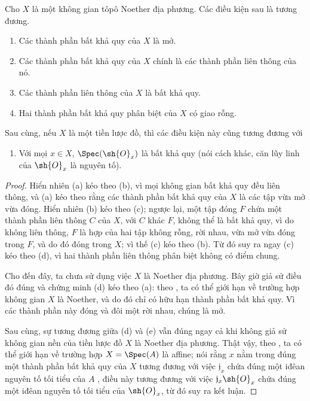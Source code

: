 \documentclass[oneside]{amsart}
\newcommand{\oldpage}[2][]{{\marginnote{\normalfont\textbf{#1}~|~#2}}\ignorespaces}
\let\EGAOriginalLabel\label
\renewcommand{\label}[1]{\phantomsection\EGAOriginalLabel{#1}}
\begin{document}
\begin{proposition}[6.1.10]
\label{I.6.1.10}
Cho $X$ là một không gian tôpô Noether địa phương.
Các điều kiện sau là tương đương.
\begin{enumerate}
  \item[{\rm(a)}] Các thành phần bất khả quy của $X$ là mở.
  \item[{\rm(b)}] Các thành phần bất khả quy của $X$ chính là các thành phần
    liên thông của nó.
  \item[{\rm(c)}] Các thành phần liên thông của $X$ là bất khả quy.
  \item[{\rm(d)}] Hai thành phần bất khả quy phân biệt của $X$ có giao rỗng.
\end{enumerate}
Sau cùng, nếu $X$ là một tiền lược đồ, thì các điều kiện này cũng tương đương
với
\begin{enumerate}
  \item[{\rm(e)}] Với mọi $x\in X$, $\Spec(\sh{O}_x)$ là bất khả quy (nói cách
    khác, căn lũy linh của $\sh{O}_x$ là nguyên tố).
\end{enumerate}
\end{proposition}

\begin{proof}
Hiển nhiên (a) kéo theo (b), vì mọi không gian bất khả quy đều liên thông, và
(a) kéo theo rằng các thành phần bất khả quy của $X$ là các tập vừa mở vừa
đóng. Hiển nhiên (b) kéo theo (c); ngược lại, một tập đóng $F$ chứa
\oldpage[I]{143}
một thành phần liên thông $C$ của $X$, với $C$ khác $F$, không thể là bất khả
quy, vì do không liên thông, $F$ là hợp của hai tập không rỗng, rời nhau, vừa
mở vừa đóng trong $F$, và do đó đóng trong $X$; vì thế (c) kéo theo (b). Từ đó
suy ra ngay (c) kéo theo (d), vì hai thành phần liên thông phân biệt không có
điểm chung.

Cho đến đây, ta chưa sử dụng việc $X$ là Noether địa phương. Bây giờ giả sử
điều đó đúng và chứng minh (d) kéo theo (a): theo , ta có thể
giới hạn về trường hợp không gian $X$ là Noether, và do đó chỉ có hữu hạn thành
phần bất khả quy. Vì các thành phần này đóng và đôi một rời nhau, chúng là mở.

Sau cùng, sự tương đương giữa (d) và (e) vẫn đúng ngay cả khi không giả sử
không gian nền của tiền lược đồ $X$ là Noether địa phương. Thật vậy, theo
, ta có thể giới hạn về trường hợp $X=\Spec(A)$ là affine;
nói rằng $x$ nằm trong đúng một thành phần bất khả quy của $X$ tương đương với
việc $\mathfrak{j}_x$ chứa đúng một iđêan nguyên tố tối tiểu của $A$
, điều này tương đương với việc
$\mathfrak{j}_x\sh{O}_x$ chứa đúng một iđêan nguyên tố tối tiểu của
$\sh{O}_x$, từ đó suy ra kết luận.
\end{proof}
\end{document}
